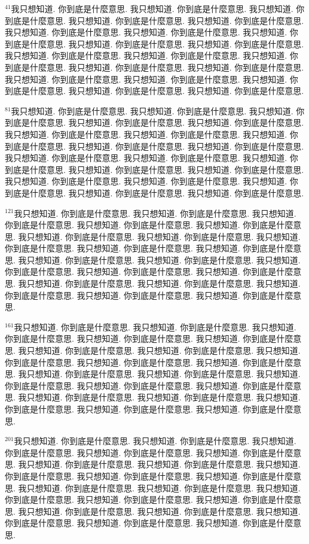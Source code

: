 \documentclass{book}
\begin{document}
$^{41}$我只想知道.
你到底是什麼意思.
我只想知道.
你到底是什麼意思.
我只想知道.
你到底是什麼意思.
我只想知道.
你到底是什麼意思.
我只想知道.
你到底是什麼意思.
我只想知道.
你到底是什麼意思.
我只想知道.
你到底是什麼意思.
我只想知道.
你到底是什麼意思.
我只想知道.
你到底是什麼意思.
我只想知道.
你到底是什麼意思.
我只想知道.
你到底是什麼意思.
我只想知道.
你到底是什麼意思.
我只想知道.
你到底是什麼意思.
我只想知道.
你到底是什麼意思.
我只想知道.
你到底是什麼意思.
我只想知道.
你到底是什麼意思.
我只想知道.
你到底是什麼意思.
我只想知道.
你到底是什麼意思.
我只想知道.
你到底是什麼意思.
我只想知道.
你到底是什麼意思.

$^{81}$我只想知道.
你到底是什麼意思.
我只想知道.
你到底是什麼意思.
我只想知道.
你到底是什麼意思.
我只想知道.
你到底是什麼意思.
我只想知道.
你到底是什麼意思.
我只想知道.
你到底是什麼意思.
我只想知道.
你到底是什麼意思.
我只想知道.
你到底是什麼意思.
我只想知道.
你到底是什麼意思.
我只想知道.
你到底是什麼意思.
我只想知道.
你到底是什麼意思.
我只想知道.
你到底是什麼意思.
我只想知道.
你到底是什麼意思.
我只想知道.
你到底是什麼意思.
我只想知道.
你到底是什麼意思.
我只想知道.
你到底是什麼意思.
我只想知道.
你到底是什麼意思.
我只想知道.
你到底是什麼意思.
我只想知道.
你到底是什麼意思.
我只想知道.
你到底是什麼意思.

$^{121}$我只想知道.
你到底是什麼意思.
我只想知道.
你到底是什麼意思.
我只想知道.
你到底是什麼意思.
我只想知道.
你到底是什麼意思.
我只想知道.
你到底是什麼意思.
我只想知道.
你到底是什麼意思.
我只想知道.
你到底是什麼意思.
我只想知道.
你到底是什麼意思.
我只想知道.
你到底是什麼意思.
我只想知道.
你到底是什麼意思.
我只想知道.
你到底是什麼意思.
我只想知道.
你到底是什麼意思.
我只想知道.
你到底是什麼意思.
我只想知道.
你到底是什麼意思.
我只想知道.
你到底是什麼意思.
我只想知道.
你到底是什麼意思.
我只想知道.
你到底是什麼意思.
我只想知道.
你到底是什麼意思.
我只想知道.
你到底是什麼意思.
我只想知道.
你到底是什麼意思.

$^{161}$我只想知道.
你到底是什麼意思.
我只想知道.
你到底是什麼意思.
我只想知道.
你到底是什麼意思.
我只想知道.
你到底是什麼意思.
我只想知道.
你到底是什麼意思.
我只想知道.
你到底是什麼意思.
我只想知道.
你到底是什麼意思.
我只想知道.
你到底是什麼意思.
我只想知道.
你到底是什麼意思.
我只想知道.
你到底是什麼意思.
我只想知道.
你到底是什麼意思.
我只想知道.
你到底是什麼意思.
我只想知道.
你到底是什麼意思.
我只想知道.
你到底是什麼意思.
我只想知道.
你到底是什麼意思.
我只想知道.
你到底是什麼意思.
我只想知道.
你到底是什麼意思.
我只想知道.
你到底是什麼意思.
我只想知道.
你到底是什麼意思.
我只想知道.
你到底是什麼意思.

$^{201}$我只想知道.
你到底是什麼意思.
我只想知道.
你到底是什麼意思.
我只想知道.
你到底是什麼意思.
我只想知道.
你到底是什麼意思.
我只想知道.
你到底是什麼意思.
我只想知道.
你到底是什麼意思.
我只想知道.
你到底是什麼意思.
我只想知道.
你到底是什麼意思.
我只想知道.
你到底是什麼意思.
我只想知道.
你到底是什麼意思.
我只想知道.
你到底是什麼意思.
我只想知道.
你到底是什麼意思.
我只想知道.
你到底是什麼意思.
我只想知道.
你到底是什麼意思.
我只想知道.
你到底是什麼意思.
我只想知道.
你到底是什麼意思.
我只想知道.
你到底是什麼意思.
我只想知道.
你到底是什麼意思.
我只想知道.
你到底是什麼意思.
我只想知道.
你到底是什麼意思.
\end{document}

